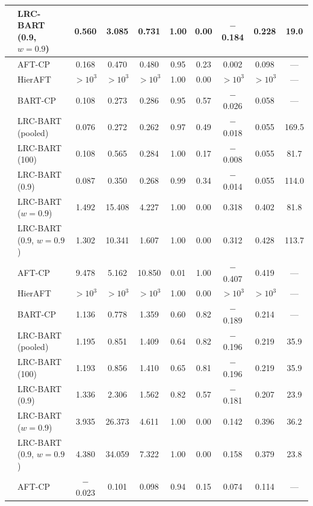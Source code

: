 \begin{center}
\begin{longtable}{llcccccccc}
& LRC-BART (0.9, $w=0.9$) & 0.560 & 3.085 & 0.731 & 1.00 & 0.00 & $-$0.184 & 0.228 & 19.0 \\
\midrule
{} & AFT-CP & 0.168 & 0.470 & 0.480 & 0.95 & 0.23 & 0.002 & 0.098 & --- \\
& HierAFT & $>\!10^{3}$ & $>\!10^{3}$ & $>\!10^{3}$ & 1.00 & 0.00 & $>\!10^{3}$ & $>\!10^{3}$ & --- \\
& BART-CP & 0.108 & 0.273 & 0.286 & 0.95 & 0.57 & $-$0.026 & 0.058 & --- \\
& LRC-BART (pooled) & 0.076 & 0.272 & 0.262 & 0.97 & 0.49 & $-$0.018 & 0.055 & 169.5 \\
& LRC-BART (100) & 0.108 & 0.565 & 0.284 & 1.00 & 0.17 & $-$0.008 & 0.055 & 81.7 \\
& LRC-BART (0.9) & 0.087 & 0.350 & 0.268 & 0.99 & 0.34 & $-$0.014 & 0.055 & 114.0 \\
& LRC-BART ($w=0.9$) & 1.492 & 15.408 & 4.227 & 1.00 & 0.00 & 0.318 & 0.402 & 81.8 \\
& LRC-BART (0.9, $w=0.9$) & 1.302 & 10.341 & 1.607 & 1.00 & 0.00 & 0.312 & 0.428 & 113.7 \\
\midrule
{} & AFT-CP & 9.478 & 5.162 & 10.850 & 0.01 & 1.00 & $-$0.407 & 0.419 & --- \\
& HierAFT & $>\!10^{3}$ & $>\!10^{3}$ & $>\!10^{3}$ & 1.00 & 0.00 & $>\!10^{3}$ & $>\!10^{3}$ & --- \\
& BART-CP & 1.136 & 0.778 & 1.359 & 0.60 & 0.82 & $-$0.189 & 0.214 & --- \\
& LRC-BART (pooled) & 1.195 & 0.851 & 1.409 & 0.64 & 0.82 & $-$0.196 & 0.219 & 35.9 \\
& LRC-BART (100) & 1.193 & 0.856 & 1.410 & 0.65 & 0.81 & $-$0.196 & 0.219 & 35.9 \\
& LRC-BART (0.9) & 1.336 & 2.306 & 1.562 & 0.82 & 0.57 & $-$0.181 & 0.207 & 23.9 \\
& LRC-BART ($w=0.9$) & 3.935 & 26.373 & 4.611 & 1.00 & 0.00 & 0.142 & 0.396 & 36.2 \\
& LRC-BART (0.9, $w=0.9$) & 4.380 & 34.059 & 7.322 & 1.00 & 0.00 & 0.158 & 0.379 & 23.8 \\
\midrule
{} & AFT-CP & $-$0.023 & 0.101 & 0.098 & 0.94 & 0.15 & 0.074 & 0.114 & --- \\

\end{longtable}
\end{center}

